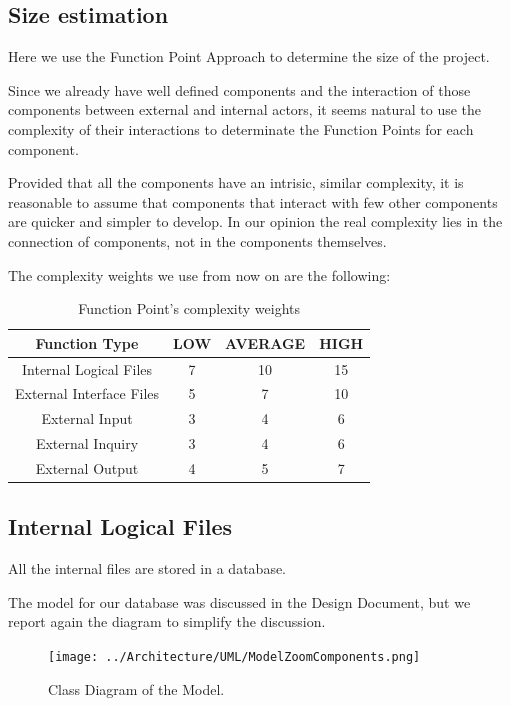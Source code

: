 \documentclass[11pt]{article} %
\begin{document}
\subsection{Size estimation}

Here we use the Function Point Approach to determine the size of the project.

Since we already have well defined components and the interaction of those components between external and internal actors, it seems natural to use the complexity of their interactions to determinate the Function Points for each component.

Provided that all the components have an intrisic, similar complexity, it is reasonable to assume that components that interact with few other components are quicker and simpler to develop. In our opinion the real complexity lies in the connection of components, not in the components themselves.

The complexity weights we use from now on are the following:
\begin{table}[h]
\centering
\bgroup
\def\arraystretch{1.5}%
	\begin{tabular}{| c | c | c | c |}
	\hline
	Function Type & LOW & AVERAGE & HIGH \\
	\hline
	Internal Logical Files & 7 & 10 & 15 \\
	External Interface Files & 5 & 7 & 10 \\
	External Input & 3 & 4 & 6 \\
	External Inquiry & 3 & 4 & 6 \\
	External Output & 4 & 5 & 7 \\
	\hline
	\end{tabular}
\egroup
\caption{Function Point's complexity weights}
\end{table}


\subsection{Internal Logical Files}

All the internal files are stored in a database.

The model for our database was discussed in the Design Document, but we report again the diagram to simplify the discussion.

\begin{figure}[H]
	\centering
	\texttt{[image: ../Architecture/UML/ModelZoomComponents.png]}
	\caption{Class Diagram of the Model.}
\end{figure}	
\end{document}
